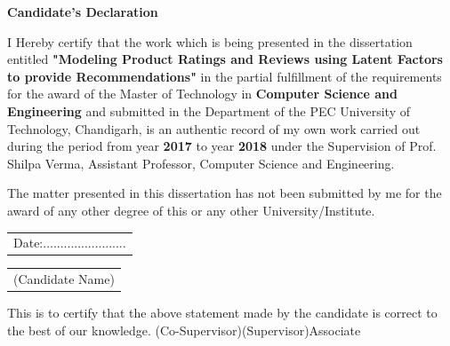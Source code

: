 \documentclass[a4paper]{article}
\begin{document}
\vspace*{5px}
    \begin{figure}[h]
        {\par}
    \end{figure}
\justify
\begin{large}
\begin{center}
\textbf{Candidate's Declaration}
\end{center}


I Hereby  certify  that  the  work  which  is  being  presented  in  the dissertation entitled \textbf{"Modeling Product Ratings and Reviews using Latent Factors to provide Recommendations"} in  the partial fulfillment of the requirements for the award of the Master of Technology in \textbf{Computer Science and Engineering} and submitted in the Department of the PEC University of Technology, Chandigarh, is  an  authentic record of my own work carried out during the period from year \textbf{2017} to year \textbf{2018} under the Supervision of Prof. Shilpa Verma, Assistant Professor, Computer Science and Engineering. \par
The  matter  presented  in  this dissertation has  not  been  submitted  by  me  for  the  award  of  any other degree of this or any other University/Institute. \par


\begin{minipage}{0.5\textwidth}
\begin{tabular}{|p{\textwidth}}
Date:........................
\end{tabular}
\end{minipage}

\begin{minipage}{0.5\textwidth}
\begin{tabular}{|p{\textwidth}}
(Candidate Name)
\end{tabular}
\end{minipage}

This  is  to  certify  that  the  above  statement  made  by  the  candidate  is  correct  to  the  best  of  our knowledge. (Co-Supervisor)(Supervisor)Associate 


\end{large}
\end{document}
